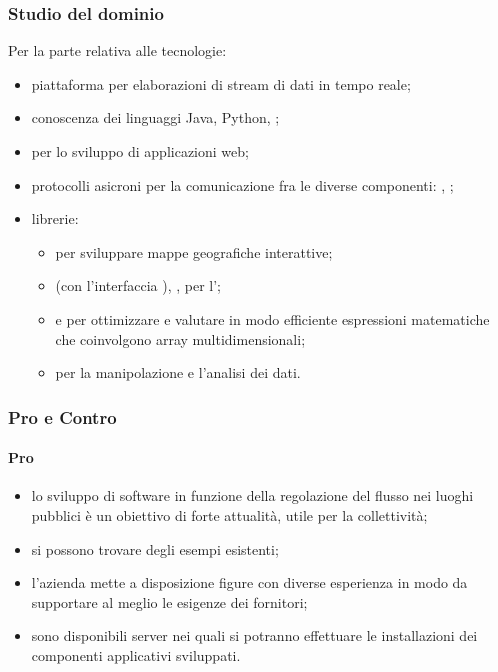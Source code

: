 \subsubsection{Studio del dominio}
Per la parte relativa alle tecnologie:
\begin{itemize}
	\item piattaforma  per elaborazioni di stream di dati in tempo reale;
	\item conoscenza dei linguaggi Java, Python, ;
	\item {}  per lo sviluppo di applicazioni web;
	\item protocolli asicroni per la comunicazione fra le diverse componenti: , ; 
	\item librerie:
	\begin{itemize}
		\item {} per sviluppare mappe geografiche interattive;
		\item {} (con l'interfaccia ), ,  per l'; 
		\item {} e  per ottimizzare e valutare in modo efficiente espressioni matematiche che coinvolgono array multidimensionali;
		\item {} per la manipolazione e l'analisi dei dati.
	\end{itemize}
\end{itemize}
\subsubsection{Pro e Contro}
\paragraph*{Pro}
\begin{itemize}
\item lo sviluppo di software in funzione della regolazione del flusso nei luoghi pubblici è un obiettivo di forte attualità, utile per la collettività;
\item si possono trovare degli esempi esistenti;
\item l'azienda mette a disposizione figure con diverse esperienza in modo da supportare al meglio le esigenze dei fornitori;
\item sono disponibili server nei quali si potranno effettuare le installazioni dei componenti applicativi sviluppati.
\end{itemize}
